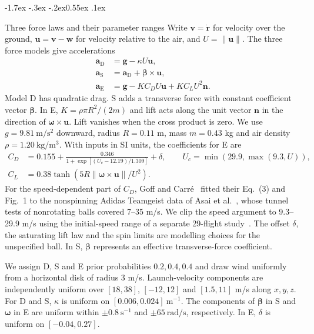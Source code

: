\documentclass[11pt,letterpaper]{article}
\makeatletter
\renewcommand{\subsection}{\reserveheadroom\@startsection{subsection}{2}{\z@}
  {-1.7ex \@plus -.3ex \@minus -.2ex}{0.55ex \@plus .1ex}
  {\normalfont\normalsize\sffamily\bfseries\color{black}\raggedright}}
\newcommand{\vv}[1]{\boldsymbol{#1}}
\newcommand{\norm}[1]{\lVert #1\rVert}
\newcommand{\reserveheadroom}{\par\ifdim\dimexpr\pagegoal-\pagetotal\relax<5\baselineskip\newpage\fi}
\makeatother
\begin{document}
\subsection{Three force laws and their parameter ranges}
\label{sec:forces}
Write \(\vv v=\dot{\vv r}\) for velocity over the ground, \(\vv u=\vv v-\vv w\) for velocity relative to the air, and \(U=\norm{\vv u}\). The three force models give accelerations
\begin{equation}
\begin{aligned}
 \vv a_{\mathrm D}&=\vv g-\kappa U\vv u,\\
 \vv a_{\mathrm S}&=\vv a_{\mathrm D}+\vv\beta\times\vv u,\\
 \vv a_{\mathrm E}&=\vv g-K C_D U\vv u+K C_L U^2\vv n .
\end{aligned}
\label{eq:acc}
\end{equation}
Model D has quadratic drag. S adds a transverse force with constant coefficient vector \(\vv\beta\). In E, \(K=\rho\pi R^2/(2m)\) and lift acts along the unit vector \(\vv n\) in the direction of \(\vv\omega\times\vv u\). Lift vanishes when the cross product is zero. We use \(g=9.81\ \mathrm{m/s^2}\) downward, radius \(R=0.11\) m, mass \(m=0.43\) kg and air density \(\rho=1.20\ \mathrm{kg/m^3}\). With inputs in SI units, the coefficients for E are
\begin{equation}
\begin{aligned}
 C_D&=0.155+\frac{0.346}{1+\exp[(U_c-12.19)/1.309]}+\delta,\qquad
 U_c=\min(29.9,\max(9.3,U)),\\
 C_L&=0.38\tanh\!\left(5R\norm{\vv\omega\times\vv u}/U^2\right).
\end{aligned}
\label{eq:coeff}
\end{equation}
For the speed-dependent part of \(C_D\), Goff and Carr\'e~\cite{goff2010} fitted their Eq.~(3) and Fig.~1 to the nonspinning Adidas Teamgeist data of Asai et al.~\cite{asai2007}, whose tunnel tests of nonrotating balls covered 7--35 m/s. We clip the speed argument to 9.3--29.9 m/s using the initial-speed range of a separate 29-flight study~\cite{goff2017}. The offset \(\delta\), the saturating lift law and the spin limits are modelling choices for the unspecified ball. In S, \(\vv\beta\) represents an effective transverse-force coefficient.

We assign D, S and E prior probabilities \(0.2,0.4,0.4\) and draw wind uniformly from a horizontal disk of radius 3 m/s. Launch-velocity components are independently uniform over \([18,38]\), \([-12,12]\) and \([1.5,11]\) m/s along \(x,y,z\). For D and S, \(\kappa\) is uniform on \([0.006,0.024]\ \mathrm{m^{-1}}\). The components of \(\vv\beta\) in S and \(\vv\omega\) in E are uniform within \(\pm0.8\ \mathrm{s^{-1}}\) and \(\pm65\ \mathrm{rad/s}\), respectively. In E, \(\delta\) is uniform on \([-0.04,0.27]\).
\end{document}
